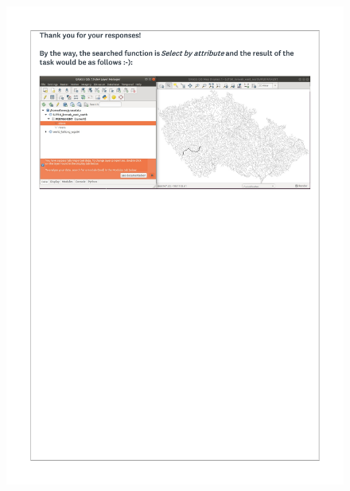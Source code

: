 \documentclass[a4paper,10pt,twoside]{article}
\begin{document}
 \newpage
 \begin{figure}[hbt!]
 \begin{center}
 \includegraphics[width=16cm]{../surveys/questionnaires/survey2-page7_final.pdf}
 \end{center}
 \end{figure}
\end{document}
